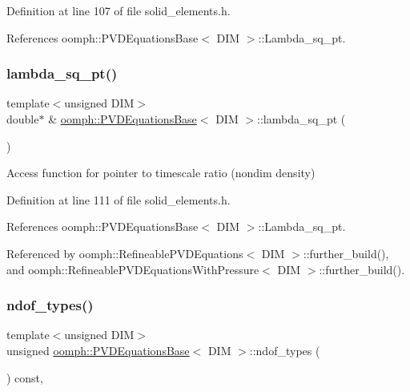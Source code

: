 Definition at line 107 of file solid\+\_\+elements.\+h.



References oomph\+::\+P\+V\+D\+Equations\+Base$<$ D\+I\+M $>$\+::\+Lambda\+\_\+sq\+\_\+pt.

\mbox{\label{classoomph_1_1PVDEquationsBase_ae18693daa7038a22239ad468b8b83a58}} 
\subsubsection{\texorpdfstring{lambda\+\_\+sq\+\_\+pt()}{lambda\_sq\_pt()}}
{\footnotesize\ttfamily template$<$unsigned D\+IM$>$ \\
double$\ast$ \& \hyperlink{classoomph_1_1PVDEquationsBase}{oomph\+::\+P\+V\+D\+Equations\+Base}$<$ D\+IM $>$\+::lambda\+\_\+sq\+\_\+pt (\begin{DoxyParamCaption}{ }\end{DoxyParamCaption})\hspace{0.3cm}{\ttfamily [inline]}}



Access function for pointer to timescale ratio (nondim density) 



Definition at line 111 of file solid\+\_\+elements.\+h.



References oomph\+::\+P\+V\+D\+Equations\+Base$<$ D\+I\+M $>$\+::\+Lambda\+\_\+sq\+\_\+pt.



Referenced by oomph\+::\+Refineable\+P\+V\+D\+Equations$<$ D\+I\+M $>$\+::further\+\_\+build(), and oomph\+::\+Refineable\+P\+V\+D\+Equations\+With\+Pressure$<$ D\+I\+M $>$\+::further\+\_\+build().

\mbox{\label{classoomph_1_1PVDEquationsBase_a749f42fea2b7138a61193c2615b2d95c}} 
\subsubsection{\texorpdfstring{ndof\+\_\+types()}{ndof\_types()}}
{\footnotesize\ttfamily template$<$unsigned D\+IM$>$ \\
unsigned \hyperlink{classoomph_1_1PVDEquationsBase}{oomph\+::\+P\+V\+D\+Equations\+Base}$<$ D\+IM $>$\+::ndof\+\_\+types (\begin{DoxyParamCaption}{ }\end{DoxyParamCaption}) const\hspace{0.3cm}{\ttfamily [inline]}, {\ttfamily [virtual]}}



